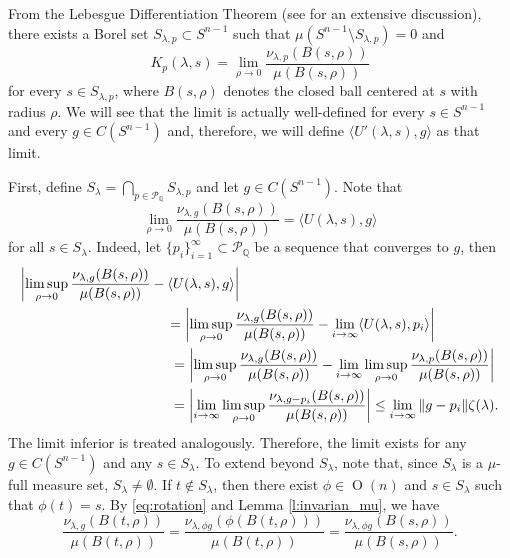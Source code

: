 \documentclass[11pt, a4paper]{amsart}
\newcommand{\sn}{{S^{n-1}}}
\newcommand{\on}{\operatorname{O}(n)}
\newcommand{\poly}{\mathcal P_{\mathbb Q}}
\begin{document}
From the Lebesgue Differentiation Theorem (see \cite[2.8-2.9]{Federer} for an extensive discussion), there exists a Borel set $S_{\lambda,p}\subset \sn$ such that $\mu(\sn\setminus S_{\lambda,p})=0$ and 
\[
    K_{p}(\lambda,s)=\lim_{\rho\to 0}\frac{\nu_{\lambda,p}(B(s,\rho))}{\mu(B(s,\rho))}
\] 
for every $s\in S_{\lambda,p}$, where $B(s,\rho)$ denotes the closed ball centered at $s$ with radius $\rho$. We will see that the limit is actually well-defined for every $s\in\sn$ and every $g\in C(\sn)$ and, therefore, we will define $\langle U'(\lambda,s),g\rangle$ as that limit. 

First, define $S_\lambda=
\bigcap_{p\in\poly}S_{\lambda,p}$ and let $g\in C(\sn)$. Note that
\begin{equation}\label{eq:U=U'ae}
    \lim_{\rho\to 0}\frac{\nu_{\lambda,g}(B(s,\rho))}{\mu(B(s,\rho))}=\langle U(\lambda,s),g\rangle
\end{equation}
for all $s\in S_\lambda$. Indeed, let $\{p_i\}_{i=1}^\infty\subset\poly$ be a sequence that converges to $g$, then
\begin{align*}
    \left|\limsup_{\rho\to 0}\frac{\nu_{\lambda,g}(B(s,\rho))}{\mu(B(s,\rho))} - \langle U(\lambda,s),g\rangle\right|\hspace{65mm}\\
    =\left|\limsup_{\rho\to 0}\frac{\nu_{\lambda,g}(B(s,\rho))}{\mu(B(s,\rho))} -\lim_{i\to\infty}\langle U(\lambda,s),p_i\rangle\right| \hspace{16mm} \\
    =\left|\limsup_{\rho\to 0}\frac{\nu_{\lambda,g}(B(s,\rho))}{\mu(B(s,\rho))} -\lim_{i\to\infty}\limsup_{\rho\to 0}\frac{\nu_{\lambda,p}(B(s,\rho))}{\mu(B(s,\rho))}\right|\hspace{1mm}\\
    =\left|\lim_{i\to\infty}\limsup_{\rho\to 0}\frac{\nu_{\lambda,g-p_i}(B(s,\rho))}{\mu(B(s,\rho))} \right|\leq \lim_{i\to\infty} \|g-p_i\|\zeta (\lambda).
\end{align*}
The limit inferior is treated analogously. Therefore, the limit exists for any $g\in C(\sn)$ and any $s\in S_\lambda$. To extend beyond $S_\lambda$, note that, since $S_\lambda$ is a $\mu$-full measure set, $S_\lambda\neq\emptyset$. If $t\not\in S_\lambda$, then there exist $\phi\in\on$ and $s\in S_\lambda$ such that $\phi(t)=s$. By \eqref{eq:rotation} and Lemma \ref{l:invarian_mu}, we have
\[
    \frac{\nu_{\lambda,g}(B(t,\rho))}{\mu(B(t,\rho))}=\frac{\nu_{\lambda,\phi g}(\phi( B(t,\rho)))}{\mu(B(t,\rho))}=\frac{\nu_{\lambda,\phi g}(B(s,\rho))}{\mu(B(s,\rho))}.
\]
\end{document}

